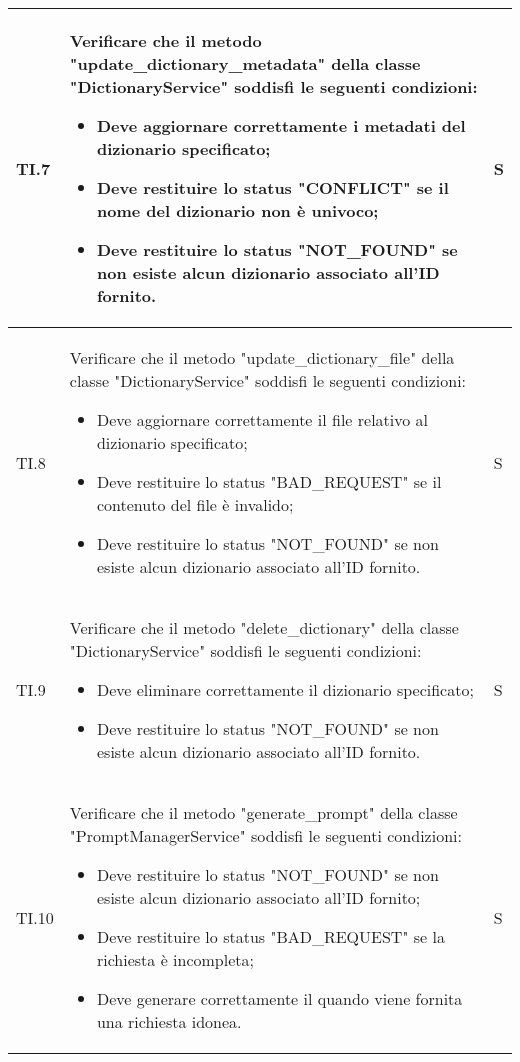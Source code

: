 \begin{adjustwidth}{-0.5cm}{-0.5cm}
\begin{longtable}{|P{1.5cm}|>{\raggedright}P{9.5cm}|>{\arraybackslash}P{1.5cm}|}
		\hline TI.7 & Verificare che il metodo "update\_dictionary_metadata" della classe "DictionaryService" soddisfi le seguenti condizioni:
		\begin{itemize}
			\item Deve aggiornare correttamente i metadati del dizionario specificato;
			\item Deve restituire lo status "CONFLICT" se il nome del dizionario non è univoco;
			\item Deve restituire lo status "NOT_FOUND" se non esiste alcun dizionario associato all'ID fornito.
		\end{itemize} & S \\

		\hline TI.8 & Verificare che il metodo "update\_dictionary\_file" della classe "DictionaryService" soddisfi le seguenti condizioni:
		\begin{itemize}
			\item Deve aggiornare correttamente il file relativo al dizionario specificato;
			\item Deve restituire lo status "BAD_REQUEST" se il contenuto del file è invalido;
			\item Deve restituire lo status "NOT_FOUND" se non esiste alcun dizionario associato all'ID fornito.
		\end{itemize} & S \\

		\hline TI.9 & Verificare che il metodo "delete\_dictionary" della classe "DictionaryService" soddisfi le seguenti condizioni:
		\begin{itemize}
			\item Deve eliminare correttamente il dizionario specificato;
			\item Deve restituire lo status "NOT_FOUND" se non esiste alcun dizionario associato all'ID fornito.
		\end{itemize} & S \\

		\hline TI.10 & Verificare che il metodo "generate\_prompt" della classe "PromptManagerService" soddisfi le seguenti condizioni:
		\begin{itemize}
			\item Deve restituire lo status "NOT_FOUND" se non esiste alcun dizionario associato all'ID fornito;
			\item Deve restituire lo status "BAD_REQUEST" se la richiesta è incompleta;
			\item Deve generare correttamente il  quando viene fornita una richiesta idonea.
		\end{itemize} & S \\


\end{longtable}
\end{adjustwidth}
